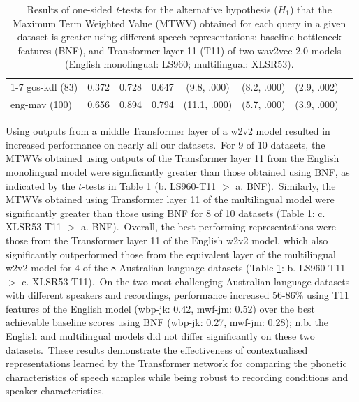 \documentclass[main.tex]{subfiles}
\begin{document}
\begin{table}[!ht]
{\begin{tabular}{lccccccc}
      \cmidrule(lr){1-7}
      gos-kdl (83) & 0.372         & 0.728           & 0.647   & (9.8, .000) & (8.2, .000) & (2.9, .002) \\
      eng-mav (100) & 0.656          & 0.894     & 0.794   & (11.1, .000) & (5.7, .000) & (3.9, .000)  \\
      \bottomrule
    \end{tabular}}
    \caption[Results of spoken term detection evaluations]{Results of one-sided \emph{t}-tests for the alternative hypothesis ($H_1$) that the Maximum Term Weighted Value (MTWV) obtained for each query in a given dataset is greater using different speech representations: baseline bottleneck features (BNF), and Transformer layer 11 (T11) of two wav2vec 2.0 models (English monolingual: LS960; multilingual: XLSR53).}
  \label{tab:ttests}
  \vspace{-1em}
\end{table}

Using outputs from a middle Transformer layer of a w2v2 model resulted in increased performance on nearly all our datasets.~For 9 of 10 datasets, the MTWVs obtained using outputs of the Transformer layer 11 from the English monolingual model were significantly greater than those obtained using BNF, as indicated by the $t$-tests in Table \ref{tab:ttests} (b. LS960-T11 $>$ a. BNF).~Similarly, the MTWVs obtained using Transformer layer 11 of the multilingual model were significantly greater than those using BNF for 8 of 10 datasets (Table \ref{tab:ttests}: c. XLSR53-T11 $>$ a. BNF).~Overall, the best performing representations were those from the Transformer layer 11 of the English w2v2 model, which also significantly outperformed those from the equivalent layer of the multilingual w2v2 model for 4 of the 8 Australian language datasets (Table \ref{tab:ttests}: b. LS960-T11 $>$ c. XLSR53-T11).~On the two most challenging Australian language datasets with different speakers and recordings, performance increased 56-86\% using T11 features of the English model (wbp-jk: 0.42, mwf-jm: 0.52) over the best achievable baseline scores using BNF (wbp-jk: 0.27, mwf-jm: 0.28); n.b. the English and multilingual models did not differ significantly on these two datasets.~These results demonstrate the effectiveness of contextualised representations learned by the Transformer network for comparing the phonetic characteristics of speech samples while being robust to recording conditions and speaker characteristics.
\end{document}
